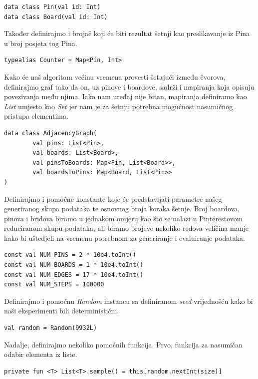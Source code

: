 \documentclass[times, utf8, seminar]{fer}
\begin{document}
\begin{lstlisting}
data class Pin(val id: Int)
data class Board(val id: Int)
\end{lstlisting}

Također definirajmo i brojač koji će biti rezultat šetnji kao preslikavanje iz Pina u broj posjeta tog Pina.

\begin{lstlisting}
typealias Counter = Map<Pin, Int>
\end{lstlisting}

Kako će naš algoritam većinu vremena provesti šetajući između čvorova, definirajmo graf tako da on, uz pinove i boardove, sadrži i mapiranja koja opisuju povezivanja među njima. Iako nam uređaj nije bitan, mapiranja definiramo kao \textit{List} umjesto kao \textit{Set} jer nam je za šetnju potrebna mogućnost nasumičnog pristupa elementima.

\begin{lstlisting}
data class AdjacencyGraph(
        val pins: List<Pin>,
        val boards: List<Board>,
        val pinsToBoards: Map<Pin, List<Board>>,
        val boardsToPins: Map<Board, List<Pin>>
)
\end{lstlisting}

Definirajmo i pomoćne konstante koje će predstavljati parametre našeg generiranog skupa podataka te osnovnog broja koraka šetnje. Broj boardova, pinova i bridova biramo u jednakom omjeru kao što se nalazi u Pinterestovom reduciranom skupu podataka, ali biramo brojeve nekoliko redova veličina manje kako bi uštedjeli na vremenu potrebnom za generiranje i evaluiranje podataka.

\begin{lstlisting}
const val NUM_PINS = 2 * 10e4.toInt()
const val NUM_BOARDS = 1 * 10e4.toInt()
const val NUM_EDGES = 17 * 10e4.toInt()
const val NUM_STEPS = 100000
\end{lstlisting}

Definirajmo i pomoćnu \textit{Random} instancu sa definiranom \textit{seed} vrijednošću kako bi naši eksperimenti bili deterministični.

\begin{lstlisting}
val random = Random(9932L)
\end{lstlisting}

Nadalje, definirajmo nekoliko pomoćnih funkcija. Prvo, funkcija za nasumičan odabir elementa iz liste.

\begin{lstlisting}
private fun <T> List<T>.sample() = this[random.nextInt(size)]
\end{lstlisting}
\end{document}
